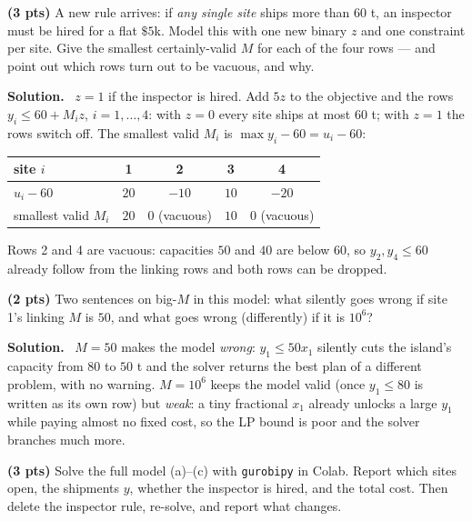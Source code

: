 \documentclass[10pt]{article}
\newenvironment{solution}
  {\par\smallskip\begingroup\color{solink}\textbf{Solution.}\ }
  {\endgroup\par}
\begin{document}
\begin{parts}
\item \textbf{(3 pts)} A new rule arrives: if \emph{any single site} ships more than
  $60$ t, an inspector must be hired for a flat $\$5$k. Model this with one new
  binary $z$ and one constraint per site. Give the smallest certainly-valid $M$ for
  each of the four rows --- and point out which rows turn out to be vacuous, and why.

\begin{solution}
$z = 1$ if the inspector is hired. Add $5z$ to the objective and the rows
$y_i \le 60 + M_i z$, $i = 1, \dots, 4$: with $z = 0$ every site ships at most $60$ t;
with $z = 1$ the rows switch off. The smallest valid $M_i$ is $\max y_i - 60 = u_i - 60$:
\begin{center}
\begin{tabular}{l|cccc}
 site $i$ & 1 & 2 & 3 & 4 \\ \hline
 $u_i - 60$ & $20$ & $-10$ & $10$ & $-20$ \\
 smallest valid $M_i$ & $20$ & $0$ (vacuous) & $10$ & $0$ (vacuous)
\end{tabular}
\end{center}
Rows 2 and 4 are vacuous: capacities $50$ and $40$ are below $60$, so $y_2, y_4 \le 60$
already follow from the linking rows and both rows can be dropped.
\end{solution}

\item \textbf{(2 pts)} Two sentences on big-$M$ in this model: what silently goes
  wrong if site 1's linking $M$ is $50$, and what goes wrong (differently) if it is
  $10^6$?

\begin{solution}
$M = 50$ makes the model \emph{wrong}: $y_1 \le 50x_1$ silently cuts the island's
capacity from $80$ to $50$ t and the solver returns the best plan of a different
problem, with no warning. $M = 10^6$ keeps the model valid (once $y_1 \le 80$ is
written as its own row) but \emph{weak}: a tiny fractional $x_1$ already unlocks a
large $y_1$ while paying almost no fixed cost, so the LP bound is poor and the solver
branches much more.
\end{solution}

\item \textbf{(3 pts)} Solve the full model (a)--(c) with \texttt{gurobipy} in
  Colab. Report which sites open, the shipments $y$, whether the
  inspector is hired, and the total cost. Then delete the inspector rule, re-solve,
  and report what changes.


\end{parts}
\end{document}
